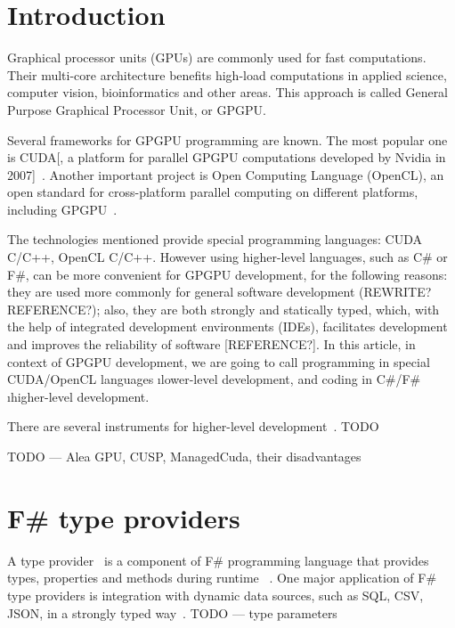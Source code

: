 \documentclass[sigplan,review]{acmart}\settopmatter{printfolios=true}
\begin{document}
\section{Introduction}

Graphical processor units (GPUs) are commonly used for fast computations.
Their multi-core architecture benefits high-load computations in applied science, computer vision, bioinformatics and other areas. 
This approach is called General Purpose Graphical Processor Unit, or GPGPU.~\cite{CUDA_to_OpenCL, GPGPU_1}

Several frameworks for GPGPU programming are known.
The most popular one is CUDA[, a platform for parallel GPGPU computations developed by Nvidia in 2007]~\cite{CUDA}.
Another important project is Open Computing Language (OpenCL), an open standard for cross-platform parallel computing on different platforms, including GPGPU~\cite{OpenCL}.

The technologies mentioned provide special programming languages: CUDA C/C++, OpenCL C/C++. 
However using higher-level languages, such as C\# or F\#, can be more convenient for GPGPU development, for the following reasons: they are used more commonly for general software development (REWRITE? REFERENCE?); also, they are both strongly and statically typed, which, with the help of integrated development environments (IDEs), facilitates development and improves the reliability of software [REFERENCE?]. 
In this article, in context of GPGPU development, we are going to call programming in special CUDA/OpenCL languages \i{lower-level development}, and coding in C\#/F\# \i{higher-level development}.

There are several instruments for higher-level development~\cite{Brahma_FSharp, FSCL, AleaGPU}. 
TODO

TODO --- Alea GPU, CUSP, ManagedCuda, their disadvantages


\section{F\# type providers}

A type provider~\cite{syme2012strongly} is a component of F\# programming language that provides types, properties and methods during runtime ~\cite{TypeProviders}. One major application of F\# type providers is integration with dynamic data sources, such as SQL, CSV, JSON, in a strongly typed way~\cite{FSharpData}. TODO --- type parameters
\end{document}
